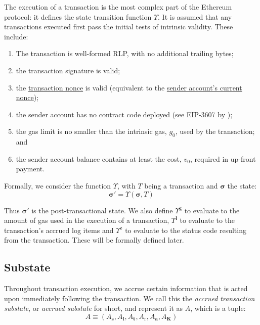 \documentclass[9pt,oneside]{amsart}
\begin{document}
\begin{multicols}{2}
The execution of a transaction is the most complex part of the Ethereum protocol: it defines the state transition function \hyperlink{Upsilon_state_transition}{$\Upsilon$}. It is assumed that any transactions executed first pass the initial tests of intrinsic validity. These include:

\begin{enumerate}
\item The transaction is well-formed RLP, with no additional trailing bytes;
\item the transaction signature is valid;
\item the \hyperlink{transaction_nonce}{transaction nonce} is valid (equivalent to the \hyperlink{account_nonce}{sender account's current nonce});
\item the sender account has no contract code deployed (see EIP-3607 by \cite{EIP-3607});
\item the gas limit is no smaller than the intrinsic gas, $g_0$, used by the transaction; and
\item the sender account balance contains at least the cost, $v_0$, required in up-front payment.
\end{enumerate}

Formally, we consider the function \hyperlink{Upsilon_state_transition}{$\Upsilon$}, with $T$ being a transaction and $\boldsymbol{\sigma}$ the state:
\begin{equation}
\boldsymbol{\sigma}' = \Upsilon(\boldsymbol{\sigma}, T)
\end{equation}

Thus $\boldsymbol{\sigma}'$ is the post-transactional state. We also define \hyperlink{tx_total_gas_used_Upsilon_pow_g}{$\Upsilon^{\mathrm{g}}$} to evaluate to the amount of gas used in the execution of a transaction, \hyperlink{tx_logs_Upsilon_pow_l}{$\Upsilon^{\mathbf{l}}$} to evaluate to the transaction's accrued log items and \hyperlink{tx_status_Upsilon_pow_z}{$\Upsilon^{\mathrm{z}}$} to evaluate to the status code resulting from the transaction. These will be formally defined later.

\subsection{Substate} \label{ch:substate}
Throughout transaction execution, we accrue certain information that is acted upon immediately following the transaction. We call this the \textit{accrued transaction substate}, or \textit{accrued substate} for short, and represent it as $A$, which is a tuple:
\begin{equation}
A \equiv (A_{\mathbf{s}}, A_{\mathbf{l}}, A_{\mathbf{t}}, A_{\mathrm{r}}, A_{\mathbf{a}}, A_{\mathbf{K}})
\end{equation}


\end{multicols}
\end{document}
